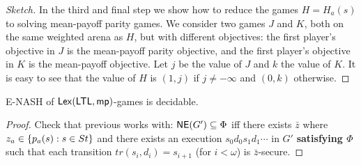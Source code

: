 \begin{proof}[Sketch]
In the third and final step we show how to reduce the games $H = H_a(s)$ to solving mean-payoff parity games. We consider two games $J$ and $K$, both on the same weighted arena as $H$, but with different objectives: the first player's objective in $J$ is the mean-payoff parity objective, and the first player's objective in $K$ is the mean-payoff objective. Let $j$ be the value of $J$ and $k$ the value of $K$. It is easy to see that the value of $H$ is $(1,j)$ if $j \neq -\infty$ and $(0,k)$ otherwise.
\end{proof}

\begin{theorem}
 E-NASH of ${\sf Lex}(\mathsf{LTL},{\sf mp})$-games is decidable. 
\end{theorem}
\begin{proof}
Check that previous works with: ${\sf NE}(G') \subseteq \Phi$ iff there exists $\bar{z}$ where $z_a \in \{p_a(s) : s \in St\}$ and there exists an execution 
$s_0 d_0 s_1 d_1 \cdots$ in $G'$ \textbf{satisfying $\Phi$} such that each transition $tr(s_i,d_i) = s_{i+1}$ (for $i < \omega$) is $\bar{z}$-secure. 
\end{proof}

